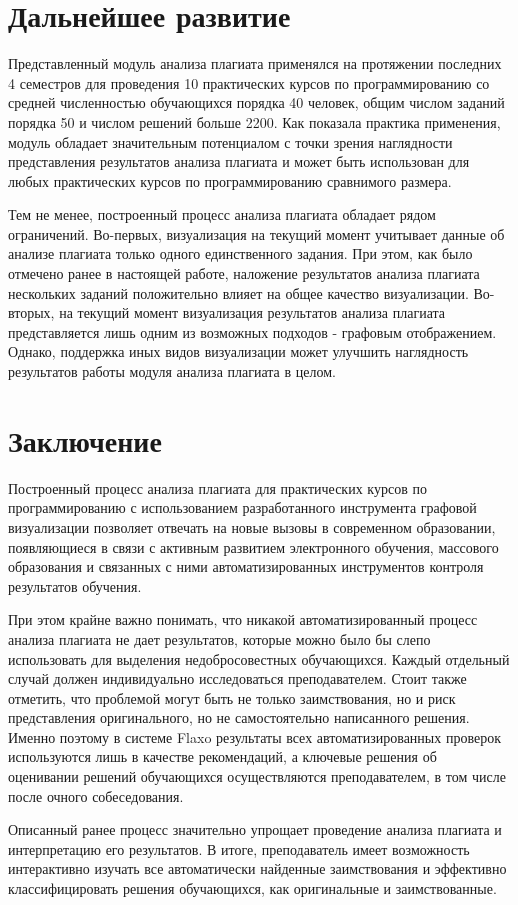 \documentclass[a4paper,14pt]{extarticle}
\begin{document}
\section{Дальнейшее развитие}

Представленный модуль анализа плагиата применялся на протяжении последних 4 семестров для проведения 10 практических курсов по программированию со средней численностью обучающихся порядка 40 человек, общим числом заданий порядка 50 и числом решений больше 2200. Как показала практика применения, модуль обладает значительным потенциалом с точки зрения наглядности представления результатов анализа плагиата и может быть использован для любых практических курсов по программированию сравнимого размера.

Тем не менее, построенный процесс анализа плагиата обладает рядом ограничений. Во-первых, визуализация на текущий момент учитывает данные об анализе плагиата только одного единственного задания. При этом, как было отмечено ранее в настоящей работе, наложение результатов анализа плагиата нескольких заданий положительно влияет на общее качество визуализации. Во-вторых, на текущий момент визуализация результатов анализа плагиата представляется лишь одним из возможных подходов - графовым отображением. Однако, поддержка иных видов визуализации может улучшить наглядность результатов работы модуля анализа плагиата в целом.

\section{Заключение}

Построенный процесс анализа плагиата для практических курсов по программированию с использованием разработанного инструмента графовой визуализации позволяет отвечать на новые вызовы в современном образовании, появляющиеся в связи с активным развитием электронного обучения, массового образования и связанных с ними автоматизированных инструментов контроля результатов обучения.

При этом крайне важно понимать, что никакой автоматизированный процесс анализа плагиата не дает результатов, которые можно было бы слепо использовать для выделения недобросовестных обучающихся. Каждый отдельный случай должен индивидуально исследоваться преподавателем. Стоит также отметить, что проблемой могут быть не только заимствования, но и риск представления оригинального, но не самостоятельно написанного решения. Именно поэтому в системе Flaxo результаты всех автоматизированных проверок используются лишь в качестве рекомендаций, а ключевые решения об оценивании решений обучающихся осуществляются преподавателем, в том числе после очного собеседования.

Описанный ранее процесс значительно упрощает проведение анализа плагиата и интерпретацию его результатов. В итоге, преподаватель имеет возможность интерактивно изучать все автоматически найденные заимствования и эффективно классифицировать решения обучающихся, как оригинальные и заимствованные.



\end{document}
